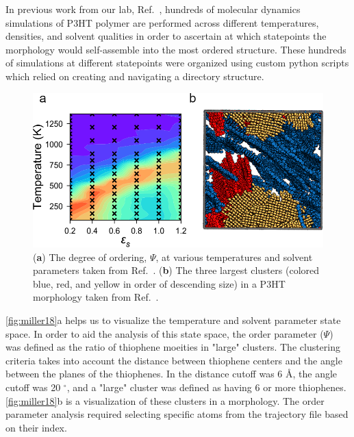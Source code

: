 In previous work from our lab, Ref.~\citet{Miller2018}, hundreds of molecular dynamics simulations of P3HT polymer are performed across different temperatures, densities, and solvent qualities in order to ascertain at which statepoints the morphology would self-assemble into the most ordered structure.
These hundreds of simulations at different statepoints were organized using custom python scripts which relied on creating and navigating a directory structure.
\begin{figure}[h!]
    \centering
    \includegraphics[width=0.8\linewidth]{figures/p3ht_val/miller2018_figs.png}
    \caption[\textbf{a}) The degree of ordering, $\Psi$, at various temperatures and solvent parameters taken from Ref. Miller et al. (\textbf{b}) The three largest clusters (colored blue, red, and yellow in order of descending size) in a P3HT morphology taken from Ref. Miller et al.]{(\textbf{a}) The degree of ordering, $\Psi$, at various temperatures and solvent parameters taken from Ref.~\citet{Miller2018}. (\textbf{b}) The three largest clusters (colored blue, red, and yellow in order of descending size) in a P3HT morphology taken from Ref.~\citet{Miller2018}.}\label{fig:miller18}
\end{figure}
\autoref{fig:miller18}a helps us to visualize the temperature and solvent parameter state space.
In order to aid the analysis of this state space, the order parameter ($\Psi$) was defined as the ratio of thiophene moeities in "large" clusters.
The clustering criteria takes into account the distance between thiophene centers and the angle between the planes of the thiophenes.
In \citet{Miller2018} the distance cutoff was 6 \AA, the angle cutoff was 20 $^{\circ}$, and a "large" cluster was defined as having 6 or more thiophenes.
\autoref{fig:miller18}b is a visualization of these clusters in a morphology.
The order parameter analysis required selecting specific atoms from the trajectory file based on their index.

